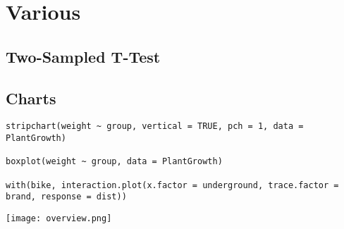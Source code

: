 \section{Various}

\subsection{Two-Sampled T-Test}

\subsection{Charts}

\begin{lstlisting}
stripchart(weight ~ group, vertical = TRUE, pch = 1, data = PlantGrowth)
	
boxplot(weight ~ group, data = PlantGrowth)

with(bike, interaction.plot(x.factor = underground, trace.factor = brand, response = dist))
\end{lstlisting}

\begin{center}
	\texttt{[image: overview.png]}
\end{center}
